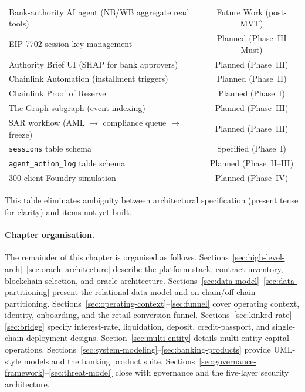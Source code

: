 \documentclass[12pt,a4paper]{report}
\newcommand{\tmarkPartial}{\faHourglassHalf}
\newcommand{\tmarkPlanned}{\textcolor{black!55}{\faCircle}}
\begin{document}
\begin{table}[H]
\begin{tabular}{@{}p{7.5cm}c@{}}
\rowcolor{RowShade}
Bank-authority AI agent (NB/WB aggregate read tools) & \tmarkPlanned{} Future Work (post-MVT) \\
EIP-7702 session key management & \tmarkPlanned{} Planned (Phase~III Must) \\
Authority Brief UI (SHAP for bank approvers) & \tmarkPlanned{} Planned (Phase~III) \\
\rowcolor{RowShade}
Chainlink Automation (installment triggers) & \tmarkPlanned{} Planned (Phase~II) \\
Chainlink Proof of Reserve & \tmarkPlanned{} Planned (Phase~I) \\
\rowcolor{RowShade}
The Graph subgraph (event indexing) & \tmarkPlanned{} Planned (Phase~III) \\
SAR workflow (AML $\to$ compliance queue $\to$ freeze) & \tmarkPlanned{} Planned (Phase~III) \\
\rowcolor{RowShade}
\texttt{sessions} table schema & \tmarkPartial{} Specified (Phase~I) \\
\texttt{agent\_action\_log} table schema & \tmarkPlanned{} Planned (Phase~II--III) \\
\rowcolor{RowShade}
300-client Foundry simulation & \tmarkPlanned{} Planned (Phase~IV) \\
\bottomrule
\end{tabular}
\end{table}

This table eliminates ambiguity between architectural specification (present tense for clarity) and items not yet built.

\paragraph{Chapter organisation.}
The remainder of this chapter is organised as follows. Sections~\ref{sec:high-level-arch}--\ref{sec:oracle-architecture} describe the platform stack, contract inventory, blockchain selection, and oracle architecture. Sections~\ref{sec:data-model}--\ref{sec:data-partitioning} present the relational data model and on-chain/off-chain partitioning. Sections~\ref{sec:operating-context}--\ref{sec:funnel} cover operating context, identity, onboarding, and the retail conversion funnel. Sections~\ref{sec:kinked-rate}--\ref{sec:bridge} specify interest-rate, liquidation, deposit, credit-passport, and single-chain deployment designs. Section~\ref{sec:multi-entity} details multi-entity capital operations. Sections~\ref{sec:system-modeling}--\ref{sec:banking-products} provide UML-style models and the banking product suite. Sections~\ref{sec:governance-framework}--\ref{sec:threat-model} close with governance and the five-layer security architecture.
\end{document}
